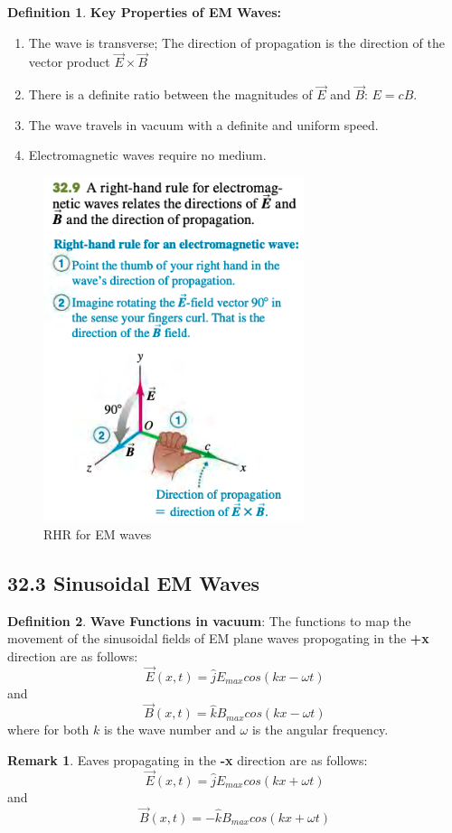 \documentclass[12pt]{amsart}
\theoremstyle{definition}
\newtheorem{definition}{Definition} %
\newtheorem*{remark}{Remark}        %
\numberwithin{equation}{theorem}    %
\begin{document}
\begin{definition}
    \textbf{Key Properties of EM Waves:}
    \begin{enumerate}
        \item The wave is transverse; The direction of propagation is the direction of the vector product $\vec{E} \times \vec{B}$
        \item There is a definite ratio between the magnitudes of $\vec{E}$  and $\vec{B}$: $E = cB$.
        \item The wave travels in vacuum with a definite and uniform speed.
        \item Electromagnetic waves require no medium.
    \end{enumerate}
\end{definition}

\begin{figure}[H]
    \centering
    \includegraphics[width=3in]{Media/EMRHR.png}
    \caption{RHR for EM waves}
    \label{RHR for EM waves}
\end{figure}

\subsection*{32.3 Sinusoidal EM Waves}

\begin{definition}
    \textbf{Wave Functions in vacuum}:
    The functions to map the movement of the sinusoidal fields of EM plane waves propogating in the \textbf{+x} direction are as follows:
    $$\vec{E}(x,t) = \hat{j}E_{max}cos(kx-\omega t)$$
    and 
    $$\vec{B}(x,t) = \hat{k}B_{max}cos(kx-\omega t)$$
    where for both $k$ is the wave number and $\omega$ is the angular frequency.
    \begin{remark}
        Eaves propagating in the \textbf{-x} direction are as follows:
        $$\vec{E}(x,t) = \hat{j}E_{max}cos(kx+\omega t)$$
    and 
    $$\vec{B}(x,t) = -\hat{k}B_{max}cos(kx+\omega t)$$ 
    \end{remark}
\end{definition}
\end{document}
